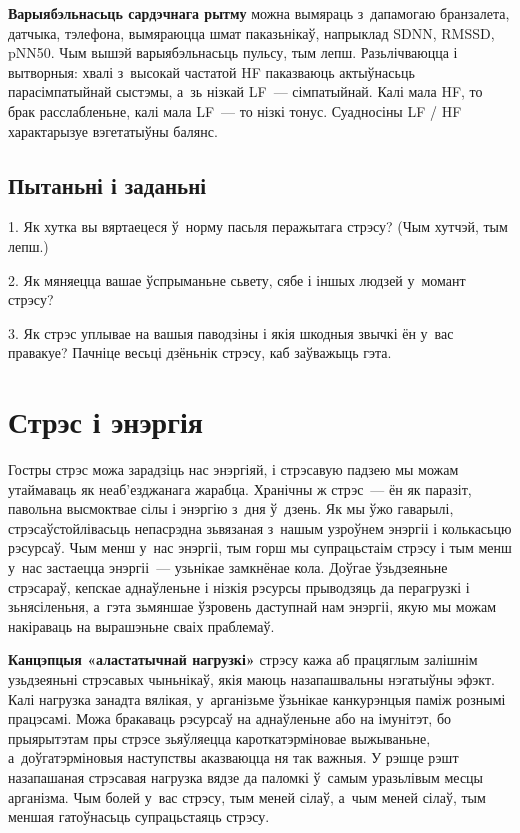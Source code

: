 \textbf{Варыябэльнасьць сардэчнага рытму} можна вымяраць з~дапамогаю бранзалета, датчыка, тэлефона, вымяраюцца шмат паказьнікаў, напрыклад SDNN, RMSSD, pNN50. Чым вышэй варыябэльнасьць пульсу, тым лепш. Разьлічваюцца і вытворныя: хвалі з~высокай частатой HF паказваюць актыўнасьць парасімпатыйнай сыстэмы, а~зь нізкай LF~--- сімпатыйнай. Калі мала HF, то брак расслабленьне, калі мала LF~--- то нізкі тонус. Суадносіны LF / HF характарызуе вэгетатыўны балянс.

\subsection*{Пытаньні і заданьні}

1. Як хутка вы вяртаецеся ў~норму пасьля перажытага стрэсу? (Чым хутчэй, тым лепш.)

2. Як мяняецца вашае ўспрыманьне сьвету, сябе і іншых людзей у~момант стрэсу?

3. Як стрэс уплывае на вашыя паводзіны і якія шкодныя звычкі ён у~вас правакуе? Пачніце весьці дзёньнік стрэсу, каб заўважыць гэта.


\section{Стрэс і энэргія}

Гостры стрэс можа зарадзіць нас энэргіяй, і стрэсавую падзею мы можам утаймаваць як неаб'езджанага жарабца. Хранічны ж стрэс~--- ён як паразіт, павольна высмоктвае сілы і энэргію з~дня ў~дзень. Як мы ўжо гаварылі, стрэсаўстойлівасьць непасрэдна зьвязаная з~нашым узроўнем энэргіі і колькасьцю рэсурсаў. Чым менш у~нас энэргіі, тым горш мы супрацьстаім стрэсу і тым менш у~нас застаецца энэргіі~--- узьнікае замкнёнае кола. Доўгае ўзьдзеяньне стрэсараў, кепскае аднаўленьне і нізкія рэсурсы прыводзяць да перагрузкі і зьнясіленьня, а~гэта зьмяншае ўзровень даступнай нам энэргіі, якую мы можам накіраваць на вырашэньне сваіх праблемаў. 


\textbf{Канцэпцыя «аластатычнай нагрузкі»} стрэсу кажа аб працяглым залішнім узьдзеяньні стрэсавых чыньнікаў, якія маюць назапашвальны нэгатыўны эфэкт. Калі нагрузка занадта вялікая, у~арганізьме ўзьнікае канкурэнцыя паміж рознымі працэсамі. Можа бракаваць рэсурсаў на аднаўленьне або на імунітэт, бо прыярытэтам пры стрэсе зьяўляецца кароткатэрміновае выжываньне, а~доўгатэрміновыя наступствы аказваюцца ня так важныя. У рэшце рэшт назапашаная стрэсавая нагрузка вядзе да паломкі ў~самым уразьлівым месцы арганізма. Чым болей у~вас стрэсу, тым меней сілаў, а~чым меней сілаў, тым меншая гатоўнасьць супрацьстаяць стрэсу.

